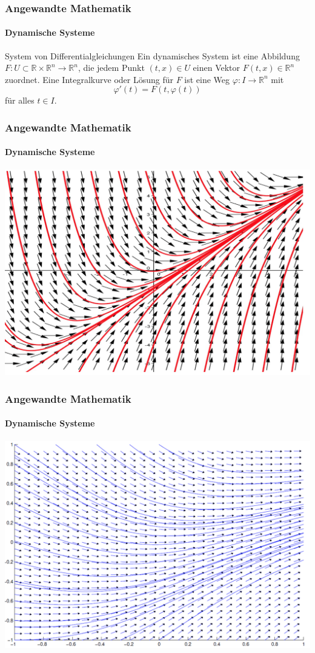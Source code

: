 \documentclass{beamer}
\begin{document}
\begin{frame}
    \frametitle{Angewandte Mathematik}
\framesubtitle{Dynamische Systeme }
\begin{block}{System von Differentialgleichungen}
Ein dynamisches System ist eine  Abbildung $F : U \subset \mathbb{R} \times \mathbb{R}^n \to \mathbb{R}^n$, die jedem Punkt $(t,x)  \in U$ einen Vektor $F(t,x) \in \mathbb{R}^n$ zuordnet. Eine Integralkurve oder Lösung für $F$ ist eine Weg $\varphi : I \to \mathbb{R}^n$ mit 
$$\varphi'(t) = F(t, \varphi(t)) $$
für alles $t \in I$.
\end{block}
 \end{frame}


 \begin{frame}
    \frametitle{Angewandte Mathematik}
\framesubtitle{Dynamische Systeme }
\center
\includegraphics[scale=0.35]{images/integralcurve1}
 \end{frame}



 \begin{frame}
    \frametitle{Angewandte Mathematik}
\framesubtitle{Dynamische Systeme }
\center
\includegraphics[scale=0.35]{images/integralcurve2}
 \end{frame}
\end{document}
